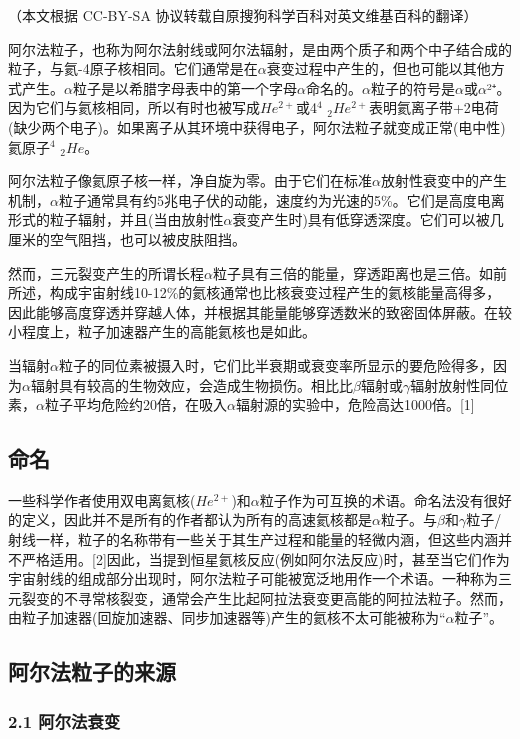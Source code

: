 
（本文根据 CC-BY-SA 协议转载自原搜狗科学百科对英文维基百科的翻译）

阿尔法粒子，也称为阿尔法射线或阿尔法辐射，是由两个质子和两个中子结合成的粒子，与氦-4原子核相同。它们通常是在$\alpha$衰变过程中产生的，但也可能以其他方式产生。$\alpha$粒子是以希腊字母表中的第一个字母$\alpha$命名的。$\alpha$粒子的符号是$\alpha$或$\alpha$²⁺。因为它们与氦核相同，所以有时也被写成$He^{2+}$或4$^4$ $_2He^{2+}$表明氦离子带+2电荷(缺少两个电子)。如果离子从其环境中获得电子，阿尔法粒子就变成正常(电中性)氦原子$^4$ $_2He$。

阿尔法粒子像氦原子核一样，净自旋为零。由于它们在标准$\alpha$放射性衰变中的产生机制，$\alpha$粒子通常具有约5兆电子伏的动能，速度约为光速的5\%。它们是高度电离形式的粒子辐射，并且(当由放射性$\alpha$衰变产生时)具有低穿透深度。它们可以被几厘米的空气阻挡，也可以被皮肤阻挡。

然而，三元裂变产生的所谓长程$\alpha$粒子具有三倍的能量，穿透距离也是三倍。如前所述，构成宇宙射线10-12\%的氦核通常也比核衰变过程产生的氦核能量高得多，因此能够高度穿透并穿越人体，并根据其能量能够穿透数米的致密固体屏蔽。在较小程度上，粒子加速器产生的高能氦核也是如此。

当辐射$\alpha$粒子的同位素被摄入时，它们比半衰期或衰变率所显示的要危险得多，因为$\alpha$辐射具有较高的生物效应，会造成生物损伤。相比比$\beta$辐射或$\gamma$辐射放射性同位素，$\alpha$粒子平均危险约20倍，在吸入$\alpha$辐射源的实验中，危险高达1000倍。[1]

\subsection{命名}
一些科学作者使用双电离氦核($He^{2+}$)和$\alpha$粒子作为可互换的术语。命名法没有很好的定义，因此并不是所有的作者都认为所有的高速氦核都是$\alpha$粒子。与$\beta$和$\gamma$粒子/射线一样，粒子的名称带有一些关于其生产过程和能量的轻微内涵，但这些内涵并不严格适用。[2]因此，当提到恒星氦核反应(例如阿尔法反应)时，甚至当它们作为宇宙射线的组成部分出现时，阿尔法粒子可能被宽泛地用作一个术语。一种称为三元裂变的不寻常核裂变，通常会产生比起阿拉法衰变更高能的阿拉法粒子。然而，由粒子加速器(回旋加速器、同步加速器等)产生的氦核不太可能被称为“$\alpha$粒子”。

\subsection{阿尔法粒子的来源}
\subsubsection{2.1 阿尔法衰变}